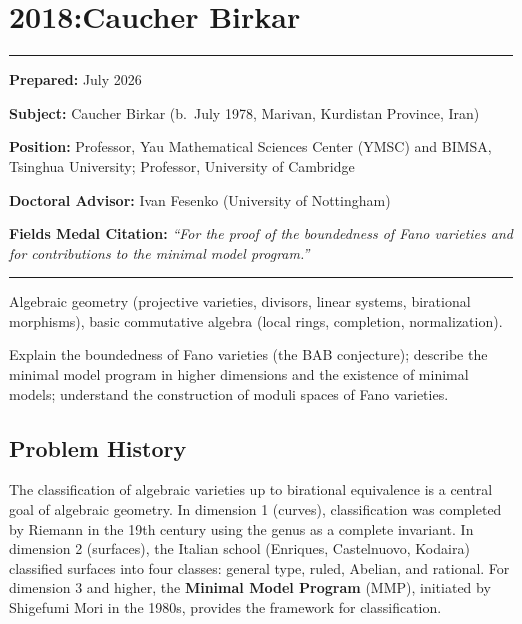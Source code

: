 \chapter{2018:Caucher Birkar}\label{ch2018caucherbirkar:caucher-birkar-fields-medal-2018-a-comprehensive-report-on-his-work-and-impact}

\begin{center}\rule{0.5\linewidth}{0.5pt}\end{center}

\textbf{Prepared:} July 2026

\textbf{Subject:} Caucher Birkar (b.\ July 1978, Marivan, Kurdistan Province, Iran)

\textbf{Position:} Professor, Yau Mathematical Sciences Center (YMSC) and BIMSA, Tsinghua University; Professor, University of Cambridge

\textbf{Doctoral Advisor:} Ivan Fesenko (University of Nottingham)

\textbf{Fields Medal Citation:} \emph{``For the proof of the boundedness of Fano varieties and for contributions to the minimal model program.''}

\begin{center}\rule{0.5\linewidth}{0.5pt}\end{center}

\begin{prereqs}
Algebraic geometry (projective varieties, divisors, linear systems, birational morphisms), basic commutative algebra (local rings, completion, normalization).
\end{prereqs}

\begin{objectives}
Explain the boundedness of Fano varieties (the BAB conjecture); describe the minimal model program in higher dimensions and the existence of minimal models; understand the construction of moduli spaces of Fano varieties.
\end{objectives}

\section{Problem History}

The classification of algebraic varieties up to birational equivalence is a central goal of algebraic geometry. In dimension 1 (curves), classification was completed by Riemann in the 19th century using the genus as a complete invariant. In dimension 2 (surfaces), the Italian school (Enriques, Castelnuovo, Kodaira) classified surfaces into four classes: general type, ruled, Abelian, and rational. For dimension 3 and higher, the \textbf{Minimal Model Program} (MMP), initiated by Shigefumi Mori in the 1980s, provides the framework for classification.

